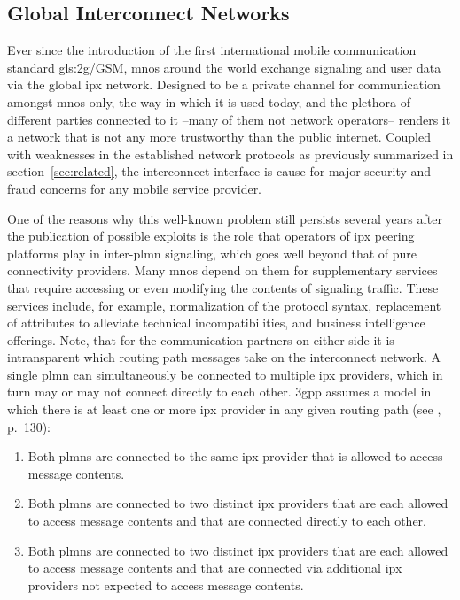 \subsection{Global Interconnect Networks}

Ever since the introduction of the first international mobile communication standard \gls{gls:2g}/GSM, \glspl{mno} around the world exchange signaling and user data via the global \gls{ipx} network.
Designed to be a private channel for communication amongst \glspl{mno} only, the way in which it is used today, and the plethora of different parties connected to it --many of them not network operators-- renders it a network that is not any more trustworthy than the public internet.
Coupled with weaknesses in the established network protocols as previously summarized in section~\ref{sec:related}, the interconnect interface is cause for major security and fraud concerns for any mobile service provider.

One of the reasons why this well-known problem still persists several years after the publication of possible exploits is the role that operators of \gls{ipx} peering platforms play in inter-\gls{plmn} signaling, which goes well beyond that of pure connectivity providers.
Many \glspl{mno} depend on them for supplementary services that require accessing or even modifying the contents of signaling traffic.
These services include, for example, normalization of the protocol syntax, replacement of attributes to alleviate technical incompatibilities, and business intelligence offerings.
Note, that for the communication partners on either side it is intransparent which routing path messages take on the interconnect network.
A single \gls{plmn} can simultaneously be connected to multiple \gls{ipx} providers, which in turn may or may not connect directly to each other.
\gls{3gpp} assumes a model in which there is at least one or more \gls{ipx} provider in any given routing path (see \cite{3gpp.33.501}, p.~130):

\begin{enumerate}[label=--]
    \item Both \glspl{plmn} are connected to the same \gls{ipx} provider that is allowed to access message contents.

    \item Both \glspl{plmn} are connected to two distinct \gls{ipx} providers that are each allowed to access message contents and that are connected directly to each other.

    \item Both \glspl{plmn} are connected to two distinct \gls{ipx} providers that are each allowed to access message contents and that are connected via additional \gls{ipx} providers not expected to access message contents.
\end{enumerate}

